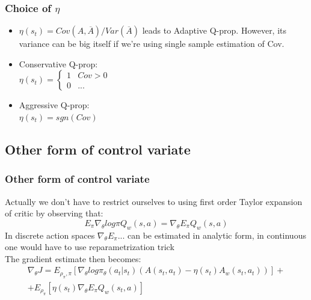 \documentclass{beamer}
\begin{document}
\begin{frame}[t]
\frametitle{Choice of $\eta$}
\begin{itemize}
\item $\eta(s_t) = Cov(A,\overline{A})/Var(\overline{A})$ leads to Adaptive Q-prop. However, its variance can be big itself if we're using single sample estimation of Cov.
\item Conservative Q-prop: \\
$\eta(s_t) =
	\begin{cases}
		1 & \text{$Cov > 0$}\\
		0 & \text{...}
	\end{cases}$
\item Aggressive Q-prop: \\
$\eta(s_t) = sgn(Cov)$
	

\end{itemize}

\end{frame}

\subsection{Other form of control variate}
\begin{frame}
\frametitle{Other form of control variate}
Actually we don't have to restrict ourselves to using first order Taylor expansion of critic by observing that:\\
\begin{equation*}
E_\pi \nabla_\theta log \pi Q_w (s, a) = \nabla_\theta E_\pi Q_w (s,a)
\end{equation*}
In discrete action spaces $\nabla_\theta E_\pi ... $ can be estimated in analytic form, in continuous one would have to use reparametrization trick\\
The gradient estimate then becomes:\\
\begin{multline*}
\nabla_{\theta} J = E_{\rho_\pi, \pi} \left[ \nabla_{\theta} log \pi_\theta ( a_t | s_t) (A(s_t, a_t) - \eta(s_t) A_w (s_t,a_t)) \right] + \\ + E_{\rho_\pi} \left[ \eta(s_t) \nabla_\theta E_\pi Q_w (s_t,a) \right]
\end{multline*}

\end{frame}
\end{document}
